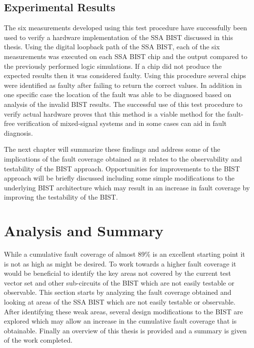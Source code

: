 \documentclass[12pt]{report}
\begin{document}
\section{Experimental Results}
The six measurements developed using this test procedure have successfully been used to verify a hardware implementation of the SSA BIST discussed in this thesis.  Using the digital loopback path of the SSA BIST, each of the six measurements was executed on each SSA BIST chip and the output compared to the previously performed logic simulations.  If a chip did not produce the expected results then it was considered faulty.  Using this procedure several chips were identified as faulty after failing to return the correct values.  In addition in one specific case the location of the fault was able to be diagnosed based on analysis of the invalid BIST results.  The successful use of this test procedure to verify actual hardware proves that this method is a viable method for the fault-free verification of mixed-signal systems and in some cases can aid in fault diagnosis.

The next chapter will summarize these findings and address some of the implications of the fault coverage obtained as it relates to the observability and testability of the BIST approach.  Opportunities for improvements to the BIST approach will be briefly discussed including some simple modifications to the underlying BIST architecture which may result in an increase in fault coverage by improving the testability of the BIST.

\chapter{Analysis and Summary}
While a cumulative fault coverage of almost 89\% is an excellent starting point it is not as high as might be desired.  To work towards a higher fault coverage it would be beneficial to identify the key areas not covered by the current test vector set and other sub-circuits of the BIST which are not easily testable or observable.  This section starts by analyzing the fault coverage obtained and looking at areas of the SSA BIST which are not easily testable or observable.  After identifying these weak areas, several design modifications to the BIST are explored which may allow an increase in the cumulative fault coverage that is obtainable.  Finally an overview of this thesis is provided and a summary is given of the work completed.
\end{document}

